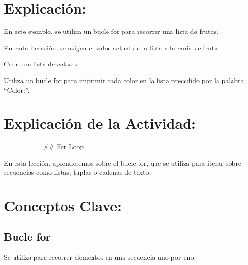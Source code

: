 \documentclass[
  a4paper,
  DIV=11,
  numbers=noendperiod,
  onepage,
  openany]{scrreprt}
\begin{document}
\hypertarget{explicaciuxf3n-42}{%
\section{Explicación:}\label{explicaciuxf3n-42}}

En este ejemplo, se utiliza un bucle for para recorrer una lista de
frutas.

En cada iteración, se asigna el valor actual de la lista a la variable
fruta.

\begin{tcolorbox}[enhanced jigsaw, colbacktitle=quarto-callout-important-color!10!white, toprule=.15mm, leftrule=.75mm, titlerule=0mm, opacityback=0, rightrule=.15mm, opacitybacktitle=0.6, breakable, left=2mm, coltitle=black, title=\textcolor{quarto-callout-important-color}{\faExclamation}\hspace{0.5em}{Actividad Práctica:}, toptitle=1mm, bottomtitle=1mm, arc=.35mm, bottomrule=.15mm, colback=white, colframe=quarto-callout-important-color-frame]

Crea una lista de colores.

Utiliza un bucle for para imprimir cada color en la lista precedido por
la palabra ``Color:''.

\end{tcolorbox}

\hypertarget{explicaciuxf3n-de-la-actividad-40}{%
\section{Explicación de la
Actividad:}\label{explicaciuxf3n-de-la-actividad-40}}

======= \#\# For Loop

En esta lección, aprenderemos sobre el bucle for, que se utiliza para
iterar sobre secuencias como listas, tuplas o cadenas de texto.

\hypertarget{conceptos-clave-43}{%
\section{Conceptos Clave:}\label{conceptos-clave-43}}

\hypertarget{bucle-for-1}{%
\subsection{Bucle for}\label{bucle-for-1}}

Se utiliza para recorrer elementos en una secuencia uno por uno.
\end{document}
